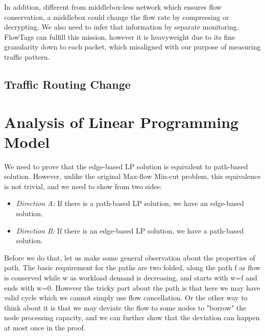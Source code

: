 \documentclass{sig-alternate}
\begin{document}
In addition, different from middlebox-less network which ensures flow conservation, a middlebox could change the flow rate by compressing or decrypting. We also need to infer that information by separate monitoring. FlowTags \cite{FLOWTAGS2014} can fulfill this mission, however it is heavyweight due to its fine granularity down to each packet, which misaligned with our purpose of measuring traffic pattern. 

\subsection{Traffic Routing Change}




%
%


\newpage

\newpage
\appendix

\section{Analysis of Linear Programming Model}
We need to prove that the edge-based LP solution is equivalent to path-based solution. However, unlike the original Max-flow Min-cut problem, this equivalence is not trivial, and we need to show from two sides:
\begin{itemize}
  \item {\textit{Direction A:} If there is a path-based LP solution, we have an edge-based solution.}
  \item {\textit{Direction B:} If there is an edge-based LP solution, we have a path-based solution.}
\end{itemize}

Before we do that, let us make some general observation about the properties of path. The basic requirement for the paths are two folded, along the path f as flow is conserved while w as workload demand is decreasing, and starts with w=f and ends with w=0. However the tricky part about the path is that here we may have valid cycle which we cannot simply use flow cancellation. Or the other way to think about it is that we may deviate the flow to some nodes to "borrow" the node processing capacity, and we can further show that the deviation can happen at most once in the proof.
\end{document}

